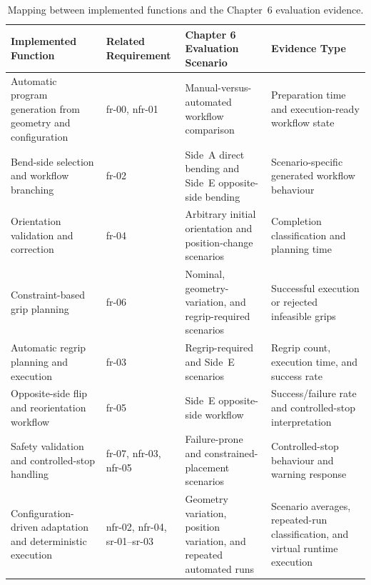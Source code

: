 \begin{table}[htbp]
\centering
\normalsize
\setlength{\tabcolsep}{3pt}
\renewcommand{\arraystretch}{1.08}
\begin{tabularx}{\textwidth}{L{3.8cm} L{3.0cm} Y Y}
\hline
\textbf{Implemented Function} &
\textbf{Related Requirement} &
\textbf{Chapter 6 Evaluation Scenario} &
\textbf{Evidence Type} \\
\hline
Automatic program generation from geometry and configuration &
\acs{fr}-00, \acs{nfr}-01 &
Manual-versus-automated workflow comparison &
Preparation time and execution-ready workflow state \\
\hline
Bend-side selection and workflow branching &
\acs{fr}-02 &
Side~A direct bending and Side~E opposite-side bending &
Scenario-specific generated workflow behaviour \\
\hline
Orientation validation and correction &
\acs{fr}-04 &
Arbitrary initial orientation and position-change scenarios &
Completion classification and planning time \\
\hline
Constraint-based grip planning &
\acs{fr}-06 &
Nominal, geometry-variation, and regrip-required scenarios &
Successful execution or rejected infeasible grips \\
\hline
Automatic regrip planning and execution &
\acs{fr}-03 &
Regrip-required and Side~E scenarios &
Regrip count, execution time, and success rate \\
\hline
Opposite-side flip and reorientation workflow &
\acs{fr}-05 &
Side~E opposite-side workflow &
Success/failure rate and controlled-stop interpretation \\
\hline
Safety validation and controlled-stop handling &
\acs{fr}-07, \acs{nfr}-03, \acs{nfr}-05 &
Failure-prone and constrained-placement scenarios &
Controlled-stop behaviour and warning response \\
\hline
Configuration-driven adaptation and deterministic execution &
\acs{nfr}-02, \acs{nfr}-04, \acs{sr}-01--\acs{sr}-03 &
Geometry variation, position variation, and repeated automated runs &
Scenario averages, repeated-run classification, and virtual runtime execution \\
\hline
\end{tabularx}
\caption{Mapping between implemented functions and the Chapter~6 evaluation evidence.}
\label{tab:ch5-implementation-evaluation-mapping}
\end{table}
